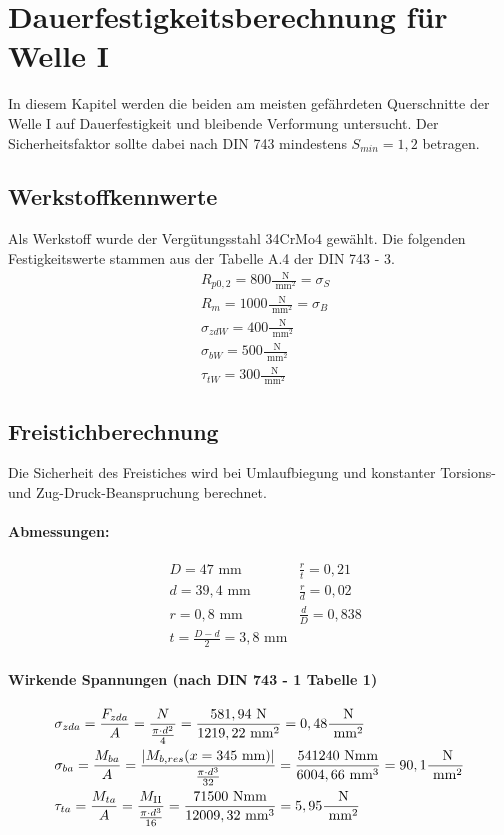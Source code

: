 \chapter{Dauerfestigkeitsberechnung für Welle I}
In diesem Kapitel werden die beiden am meisten gefährdeten Querschnitte der Welle I auf Dauerfestigkeit und bleibende Verformung untersucht. Der Sicherheitsfaktor sollte dabei nach DIN 743 mindestens $S_{min} = 1,2$ betragen.
\section{Werkstoffkennwerte}
Als Werkstoff wurde der Vergütungsstahl 34CrMo4 gewählt. Die folgenden Festigkeitswerte stammen aus der Tabelle A.4 der DIN 743 - 3.
\begin{align*}
	&R_{p0,2} = 800 \frac{\text{ N}}{\text{ mm}^2} = \sigma_S \\
	&R_{m} = 1000 \frac{\text{ N}}{\text{ mm}^2} = \sigma_B \\
	&\sigma_{zdW} = 400 \frac{\text{ N}}{\text{ mm}^2} \\
	&\sigma_{bW} = 500 \frac{\text{ N}}{\text{ mm}^2} \\
	&\tau_{tW} = 300 \frac{\text{ N}}{\text{ mm}^2} 
\end{align*}

\section{Freistichberechnung}
Die Sicherheit des Freistiches wird bei Umlaufbiegung und konstanter Torsions- und Zug-Druck-Beanspruchung berechnet.
\subsubsection{Abmessungen:}
\begin{align*}
	&D= 47 \text{ mm} & \frac{r}{t} = 0,21 \\
	&d= 39,4 \text{ mm} & \frac{r}{d} = 0,02 \\
	& r= 0,8 \text{ mm} & \frac{d}{D} = 0,838 \\
	& t= \frac{D-d}{2} = 3,8 \text{ mm} 
\end{align*}
\subsubsection{Wirkende Spannungen (nach DIN 743 - 1 Tabelle 1)}
\begin{align*}
	&\sigma_{zda} = \frac{F_{zda}}{A} = \frac{N}{\frac{\pi \cdot d^2}{4}} = \frac{581,94 \text{ N}}{1219,22 \text{ mm}^2} = 0,48 \frac{\text{ N}}{\text{ mm}^2} \\
	&\sigma_{ba} = \frac{M_{ba}}{A} = \frac{|M_{b,res}(x=345 \text{ mm}) |}{\frac{\pi \cdot d^3}{32}} = \frac{541240 \text{ Nmm}}{6004,66 \text{ mm}^3} = 90,1 \frac{\text{ N}}{\text{ mm}^2} \\
	&\tau_{ta} = \frac{M_{ta}}{A} = \frac{M_{\mathrm{II}}}{\frac{\pi \cdot d^3}{16}} = \frac{71500 \text{ Nmm}}{12009,32 \text{ mm}^3} = 5,95 \frac{\text{ N}}{\text{ mm}^2} 
\end{align*}
